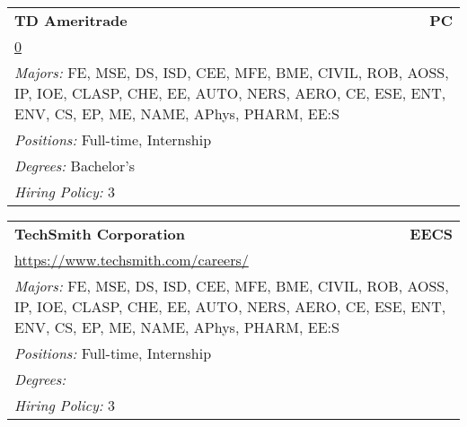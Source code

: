 \documentclass[twoside]{article}
\begin{document}
\begin{center}
\begin{multicols}{3}
\begin{FlushLeft}
\begin{minipage}{.9\columnwidth}
\end{minipage}
 
\begin{minipage}{.9\columnwidth}\begin{tabularx}{.95\columnwidth}{Xr}
                 {\Large\bf TD Ameritrade} & {\Large\bf PC}\\
    \multicolumn{2}{p{.95\columnwidth}}{\url{0}}\\
    \multicolumn{2}{p{.95\columnwidth}}{\emph{Majors:} FE, MSE, DS, ISD, CEE, MFE, BME, CIVIL, ROB, AOSS, IP, IOE, CLASP, CHE, EE, AUTO, NERS, AERO, CE, ESE, ENT, ENV, CS, EP, ME, NAME, APhys, PHARM, EE:S}\\
    \multicolumn{2}{p{.95\columnwidth}}{\emph{Positions:} Full-time, Internship}\\
    \multicolumn{2}{p{.95\columnwidth}}{\emph{Degrees:} Bachelor's}\\
    \multicolumn{2}{p{.95\columnwidth}}{\emph{Hiring Policy:} 3}\\
    \end{tabularx}
    
\end{minipage}
 
\begin{minipage}{.9\columnwidth}\begin{tabularx}{.95\columnwidth}{Xr}
                 {\Large\bf TechSmith Corporation} & {\Large\bf EECS}\\
    \multicolumn{2}{p{.95\columnwidth}}{\url{https://www.techsmith.com/careers/}}\\
    \multicolumn{2}{p{.95\columnwidth}}{\emph{Majors:} FE, MSE, DS, ISD, CEE, MFE, BME, CIVIL, ROB, AOSS, IP, IOE, CLASP, CHE, EE, AUTO, NERS, AERO, CE, ESE, ENT, ENV, CS, EP, ME, NAME, APhys, PHARM, EE:S}\\
    \multicolumn{2}{p{.95\columnwidth}}{\emph{Positions:} Full-time, Internship}\\
    \multicolumn{2}{p{.95\columnwidth}}{\emph{Degrees:} }\\
    \multicolumn{2}{p{.95\columnwidth}}{\emph{Hiring Policy:} 3}\\
    \end{tabularx}
    
\end{minipage}
 

\end{FlushLeft}
\end{multicols}
\end{center}
\end{document}
